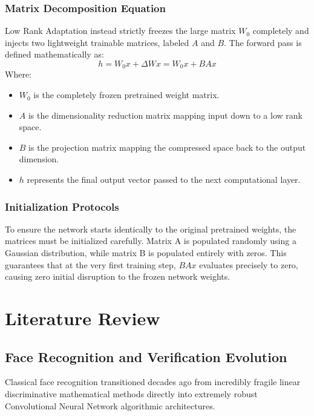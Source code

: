 \documentclass[12pt,a4paper]{report}
\begin{document}
\subsection{Matrix Decomposition Equation}
Low Rank Adaptation instead strictly freezes the large matrix $W_0$ completely and injects two lightweight trainable matrices, labeled $A$ and $B$. The forward pass is defined mathematically as:
\begin{equation}
h = W_0 x + \Delta W x = W_0 x + B A x
\end{equation}
Where:
\begin{itemize}
    \item $W_0$ is the completely frozen pretrained weight matrix.
    \item $A$ is the dimensionality reduction matrix mapping input down to a low rank space.
    \item $B$ is the projection matrix mapping the compressed space back to the output dimension.
    \item $h$ represents the final output vector passed to the next computational layer.
\end{itemize}

\subsection{Initialization Protocols}
To ensure the network starts identically to the original pretrained weights, the matrices must be initialized carefully. Matrix A is populated randomly using a Gaussian distribution, while matrix B is populated entirely with zeros. This guarantees that at the very first training step, $BAx$ evaluates precisely to zero, causing zero initial disruption to the frozen network weights.

\chapter{Literature Review}
\section{Face Recognition and Verification Evolution}
Classical face recognition transitioned decades ago from incredibly fragile linear discriminative mathematical methods directly into extremely robust Convolutional Neural Network algorithmic architectures. 
\end{document}
